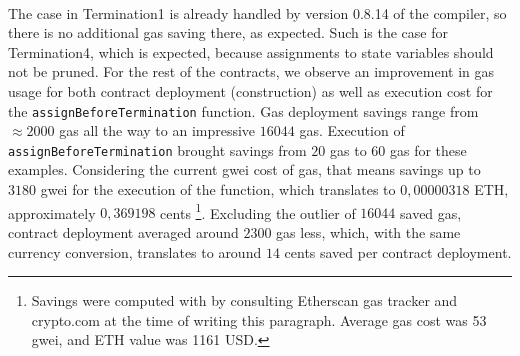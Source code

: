 \paragraph*{}
The case in Termination1 is already handled by version 0.8.14 of the compiler, so there is no additional gas saving there, as expected. Such is the case for Termination4, which is expected, because assignments to state variables should not be pruned. For the rest of the contracts, we observe an improvement in gas usage for both contract deployment (construction) as well as execution cost for the \lstinline[columns=fixed]{assignBeforeTermination} function. Gas deployment savings range from $\approx2000$ gas all the way to an impressive $16044$ gas. Execution of \lstinline[columns=fixed]{assignBeforeTermination} brought savings from $20$ gas to $60$ gas for these examples. Considering the current gwei cost of gas, that means savings up to $3180$ gwei for the execution of the function, which translates to $0,00000318$ ETH, approximately $0,369198$ cents \footnote{Savings were computed with by consulting Etherscan gas tracker and crypto.com at the time of writing this paragraph. Average gas cost was 53 gwei, and ETH value was 1161 USD.}. Excluding the outlier of $16044$ saved gas, contract deployment averaged around $2300$ gas less, which, with the same currency conversion, translates to around $14$ cents saved per contract deployment.
